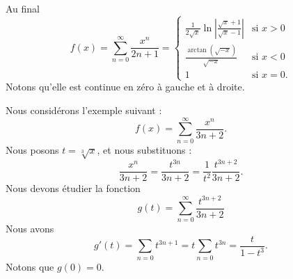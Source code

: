 \begin{example}
	Au final
	\begin{equation}        \label{EqIHlDjG}
		f(x)=\sum_{n=0}^{\infty}\frac{ x^n }{ 2n+1 }=\begin{cases}
			\frac{ 1 }{2\sqrt{x}}\ln\left| \frac{ \sqrt{x}+1 }{ \sqrt{x}-1 } \right| & \text{si } x>0  \\
			\frac{ \arctan(\sqrt{-x}) }{ \sqrt{-x} }                                 & \text{si } x<0  \\
			1                                                                        & \text{si } x=0.
		\end{cases}
	\end{equation}
	Notons qu'elle est continue en zéro à gauche et à droite.

\end{example}

\begin{example}
	Nous considérons l'exemple suivant :
	\begin{equation}
		f(x)=\sum_{n=0}^{\infty}\frac{ x^n }{ 3n+2 }.
	\end{equation}
	Nous posons \( t=\sqrt[3]{x}\), et nous substituons :
	\begin{equation}
		\frac{ x^n }{ 3n+2 }=\frac{ t^{3n} }{ 3n+2 }=\frac{1}{ t^2 }\frac{ t^{3n+2} }{ 3n+2 }.
	\end{equation}
	Nous devons étudier la fonction
	\begin{equation}
		g(t)=\sum_{n=0}^{\infty}\frac{ t^{3n+2} }{ 3n+2 }
	\end{equation}
	Nous avons
	\begin{equation}
		g'(t)=\sum_{n=0}t^{3n+1}=t\sum_{n=0}t^{3n}=\frac{ t }{ 1-t^3 }.
	\end{equation}
	Notons que \( g(0)=0\).
\end{example}

